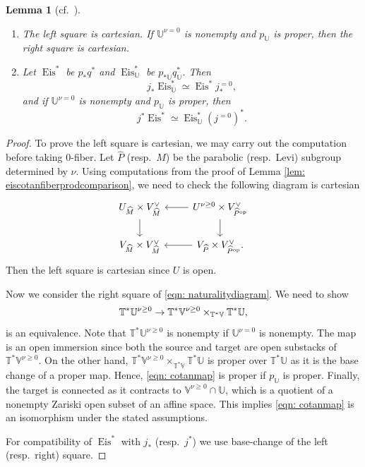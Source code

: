 \documentclass{amsart}
\newtheorem{lemma}[theorem]{Lemma}
\theoremstyle{definition}
\theoremstyle{remark}
\numberwithin{equation}{section}
\newcommand{\U}{\mathbb{U}}
\newcommand{\op}{\mathrm{op}}
\newcommand{\wh}{\widehat}
\DeclareMathOperator{\Eis}{\mathrm{Eis}}
\newcommand{\V}{\mathbb{V}}
\newcommand{\T}{\mathbb{T}}
\begin{document}
\begin{lemma}[{cf.~\cite[Lemma 6.10]{PTDolbeault}}]{\label{lem: eisfiberprod}}
    \begin{enumerate}
\item The left square is cartesian. If $\U^{\nu = 0}$ is nonempty and $p_\U$ is proper, then the right square is cartesian.
\item Let $\Eis^{\ast}$ be $p_{\ast}q^{\ast}$ and $\Eis^{\ast}_\U$ be $p_{\ast \U}q^{\ast}_\U$. Then 
\begin{equation*}
    j_{\ast}\Eis^{\ast}_\U \simeq \Eis^{\ast} j^{=0}_{\ast},
\end{equation*}
and if $\U^{\nu = 0}$ is nonempty and $p_\U$ is proper, then
\begin{equation*}
        j^{\ast}\Eis^{\ast} \simeq \Eis^{\ast}_\U (j^{=0})^{\ast}.
\end{equation*}

    \end{enumerate}
\end{lemma}
\begin{proof}
To prove the left square is cartesian, we may carry out the computation before taking $0$-fiber. Let $\wh{P}$ (resp.~$\wh{M}$) be the parabolic (resp.~Levi) subgroup determined by $\nu$. Using computations from the proof of Lemma \ref{lem: eiscotanfiberprodcomparison}, we need to check the following diagram is cartesian
\begin{equation*}
    \begin{tikzcd}
        U_{\wh{M}} \times V^{\vee}_{\wh{M}} \arrow[d] & U^{\nu \geq 0} \times V^{\vee}_{\wh{P}^{\op}}  \arrow[l] \arrow[d] \\
        V_{\wh{M}} \times V^{\vee}_{\wh{M}} & V_{\wh{P}} \times V^{\vee}_{\wh{P}^{\op}} \arrow[l].
    \end{tikzcd}
\end{equation*}
Then the left square is cartesian since $U$ is open. 

Now we consider the right square of \eqref{eqn: naturalitydiagram}. We need to show \begin{equation}{\label{eqn: cotanmap}}
    \T^{\ast}\U^{\nu \geq 0} \rightarrow \T^{\ast}\V^{\nu \geq 0} \times_{\T^{\ast}\V} \T^{\ast}\U,
\end{equation} 
is an equivalence. Note that $\T^{\ast}\U^{\nu \geq 0}$ is nonempty if $\U^{\nu=0}$ is nonempty. The map is an open immersion since both the source and target are open substacks of $\T^{\ast}\V^{\nu \geq 0}$. On the other hand, $\T^{\ast}\V^{\nu \geq 0} \times_{\T^{\ast}\V} \T^{\ast}\U$ is proper over $\T^{\ast}\U$ as it is the base change of a proper map. Hence, \eqref{eqn: cotanmap} is proper if $p_{\U}$ is proper. Finally, the target is connected as it contracts to $\V^{\nu \geq 0} \cap \U$, which is a quotient of a nonempty Zariski open subset of an affine space. This implies \eqref{eqn: cotanmap} is an isomorphism under the stated assumptions. 

For compatibility of $\Eis^{\ast}$ with $j_{\ast}$ (resp.~$j^{\ast}$) we use base-change of the left (resp.~right) square.
\end{proof}
\end{document}
